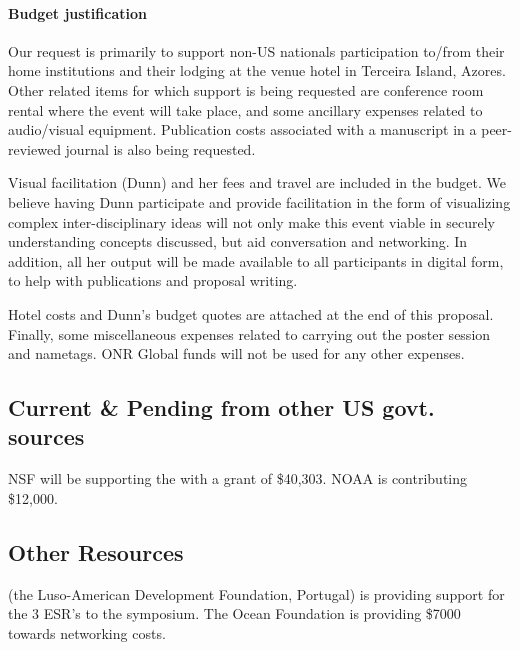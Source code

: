 \paragraph{Budget justification} Our request is primarily to support
non-US nationals participation to/from their home institutions and
their lodging at the venue hotel in Terceira Island, Azores. Other
related items for which support is being requested are conference room
rental where the event will take place, and some ancillary expenses
related to audio/visual equipment. Publication costs associated with a
manuscript in a peer-reviewed journal is also being requested.

Visual facilitation (Dunn) and her fees and travel are included in the
budget. We believe having Dunn participate and provide facilitation in
the form of visualizing complex inter-disciplinary ideas will not only
make this event viable in securely understanding concepts discussed,
but aid conversation and networking. In addition, all her output will
be made available to all participants in digital form, to help with
publications and proposal writing.

Hotel costs and Dunn's budget quotes are attached at the end of this
proposal. Finally, some miscellaneous expenses related to carrying out
the poster session and nametags. ONR Global funds will not be used for
any other expenses.

\subsection{Current \& Pending from other US govt. sources}

NSF will be supporting the \symp with a grant of \$40,303. NOAA is
contributing \$12,000.

\subsection{Other Resources}

\fla (the Luso-American Development Foundation, Portugal) is providing
support for the 3 ESR's to the symposium. The Ocean Foundation is
providing \$7000 towards networking costs.
